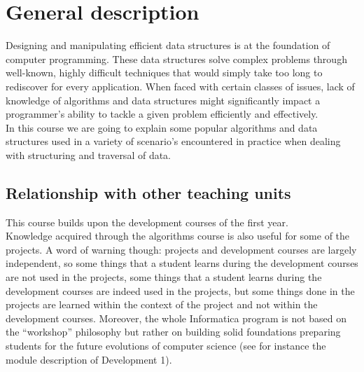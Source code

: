 \section{General description}
	Designing and manipulating efficient data structures is at the foundation of computer programming. 
	These data structures solve complex problems through well-known, highly difficult techniques that would simply take too long to rediscover for every application. When faced with certain classes of issues, lack of knowledge of algorithms and data structures might significantly impact a programmer's ability to tackle a given problem efficiently and effectively. \\	
	In this course we are going to explain some popular algorithms and data structures used in a variety of scenario's encountered in practice when dealing with structuring and traversal of data. \\

\subsection{Relationship with other teaching units}
	This course builds upon the development courses of the first year.	\\		
		
	Knowledge acquired through the algorithms course is also useful for some of the projects. A word of warning though: projects and development courses are largely independent, so some things that a student learns during the development courses are not used in the projects, some things that a student learns during the development courses are indeed used in the projects, but some things done in the projects are learned within the context of the project and not within the development courses. Moreover, the whole Informatica program is not based on the \textquotedblleft workshop\textquotedblright{} philosophy but rather on building solid foundations preparing students for the future evolutions of computer science (see for instance the module description of Development 1).
